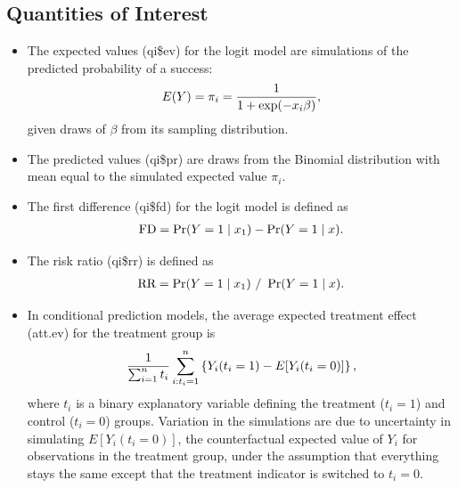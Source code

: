 \documentclass[letterpaper,10pt,english]{sphinxmanual}
\begin{document}
\subsection{Quantities of Interest}
\label{vignette:id9}\begin{itemize}
\item {} 
The expected values (qi\$ev) for the logit model are simulations of
the predicted probability of a success:
\begin{gather}
\begin{split}E(Y) =
  \pi_i= \frac{1}{1 + \exp(-x_i \beta)},\end{split}\notag
\end{gather}
given draws of \(\beta\) from its sampling distribution.

\item {} 
The predicted values (qi\$pr) are draws from the Binomial distribution
with mean equal to the simulated expected value \(\pi_i\).

\item {} 
The first difference (qi\$fd) for the logit model is defined as
\begin{gather}
\begin{split}\textrm{FD} = \Pr(Y = 1 \mid x_1) - \Pr(Y = 1 \mid x).\end{split}\notag
\end{gather}
\item {} 
The risk ratio (qi\$rr) is defined as
\begin{gather}
\begin{split}\textrm{RR} = \Pr(Y = 1 \mid x_1) \ / \ \Pr(Y = 1 \mid x).\end{split}\notag
\end{gather}
\item {} 
In conditional prediction models, the average expected treatment
effect (att.ev) for the treatment group is
\begin{gather}
\begin{split}\frac{1}{\sum_{i=1}^n t_i}\sum_{i:t_i=1}^n \left\{ Y_i(t_i=1) -
      E[Y_i(t_i=0)] \right\},\end{split}\notag
\end{gather}
where \(t_i\) is a binary explanatory variable defining the
treatment (\(t_i=1\)) and control (\(t_i=0\)) groups.
Variation in the simulations are due to uncertainty in simulating
\(E[Y_i(t_i=0)]\), the counterfactual expected value of
\(Y_i\) for observations in the treatment group, under the
assumption that everything stays the same except that the treatment
indicator is switched to \(t_i=0\).


\end{itemize}
\end{document}

